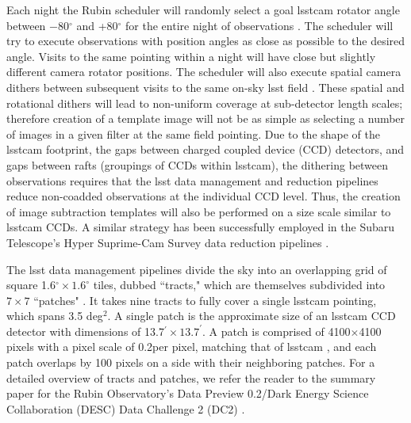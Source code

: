 \documentclass[preprintm,linenumbers]{aastex631}
\begin{document}
	Each night the Rubin scheduler will randomly select a goal \gls*{lsstcam} rotator angle between $-$80$^{\circ}$ and +80$^{\circ}$ for the entire night of observations \citep{v4.0sims}. 
 The scheduler will try to execute observations with position angles as close as possible to the desired angle. Visits to the same pointing within a night will have close but slightly different camera rotator positions. 
 The scheduler will also execute spatial camera dithers between subsequent visits to the same on-sky \gls*{lsst} field \citep{v4.0sims}. 
These spatial and rotational dithers will lead to non-uniform coverage at sub-detector length scales; therefore creation of a template image will not be as simple as selecting a number of images in a given filter at the same field pointing. 
 Due to the shape of the \gls*{lsstcam} footprint, the gaps between charged coupled device (CCD) detectors, and gaps between rafts (groupings of CCDs within \gls*{lsstcam}), the dithering between observations requires that the \gls*{lsst} data management and reduction pipelines reduce non-coadded observations at the individual CCD level. Thus, the creation of image subtraction templates will also be performed on a size scale similar to \gls*{lsstcam} CCDs.
 A similar strategy has been successfully employed in the Subaru Telescope's Hyper Suprime-Cam Survey data reduction pipelines \citep{2018PASJ...70S...5B}. 
 
	
	The \gls*{lsst} data management pipelines divide the sky into an overlapping grid of square 1.6$^{\circ} \times 1.6^{\circ}$ tiles, dubbed ``tracts," which are themselves subdivided into $7 \times 7$ ``patches" \citep[see Figure \ref{fig:tractsandpatches} and][]{2018PASJ...70S...5B, LDM-151}. 
	It takes nine tracts to fully cover a single \gls*{lsstcam} pointing, which spans 3.5 deg$^2$. A single patch is the approximate size of an \gls*{lsstcam} CCD detector with dimensions of 13.7$^{\prime} \times 13.7^{\prime}$. A patch is comprised of 4100$\times$4100 pixels with a pixel scale of 0.2\arcsec per pixel, matching that of \gls*{lsstcam} \citep{2019ApJ...873..111I,LDM-151}, and each patch overlaps by 100 pixels on a side with their neighboring patches.  For a detailed overview of tracts and patches, we refer the reader to the summary paper for the Rubin Observatory's Data Preview 0.2/Dark Energy Science Collaboration (DESC) Data Challenge 2 (DC2) \citep{2021ApJS..253...31L}.  
	
\end{document}
